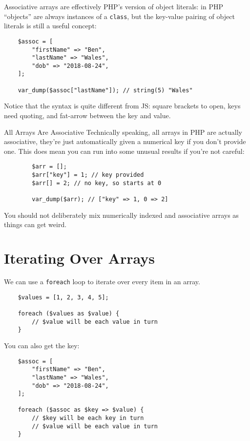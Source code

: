 Associative arrays are effectively PHP's version of object literals: in PHP ``objects'' are always instances of a \texttt{class}, but the key-value pairing of object literals is still a useful concept:

\begin{verbatim}
    $assoc = [
        "firstName" => "Ben",
        "lastName" => "Wales",
        "dob" => "2018-08-24",
    ];

    var_dump($assoc["lastName"]); // string(5) "Wales"
\end{verbatim}

Notice that the syntax is quite different from JS: square brackets to open, keys need quoting, and fat-arrow between the key and value.


\begin{infobox}{All Arrays Are Associative}
    Technically speaking, all arrays in PHP are actually associative, they're just automatically given a numerical key if you don't provide one. This does mean you can run into some unusual results if you're not careful:

    \begin{verbatim}
        $arr = [];
        $arr["key"] = 1; // key provided
        $arr[] = 2; // no key, so starts at 0

        var_dump($arr); // ["key" => 1, 0 => 2]
    \end{verbatim}

    You should not deliberately mix numerically indexed and associative arrays as things can get weird.
\end{infobox}


\section{Iterating Over Arrays}

We can use a \texttt{foreach} loop to iterate over every item in an array.

\begin{verbatim}
    $values = [1, 2, 3, 4, 5];

    foreach ($values as $value) {
        // $value will be each value in turn
    }
\end{verbatim}

You can also get the key:

\begin{verbatim}
    $assoc = [
        "firstName" => "Ben",
        "lastName" => "Wales",
        "dob" => "2018-08-24",
    ];

    foreach ($assoc as $key => $value) {
        // $key will be each key in turn
        // $value will be each value in turn
    }
\end{verbatim}

